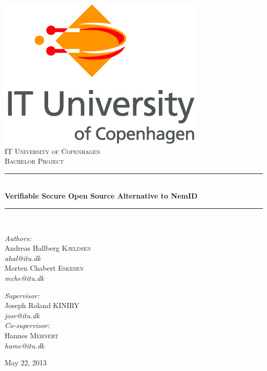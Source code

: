 \documentclass[twosided]{report}
\newcommand{\HRule}{\rule{\linewidth}{0.5mm}}
\begin{document}
\begin{titlepage}
\begin{center}

\includegraphics[scale=0.4]{images/ITULogo.jpg}\\[1cm]

\textsc{\LARGE IT University of Copenhagen}\\[1.5cm]

\textsc{\Large Bachelor Project}\\[0.5cm]


\HRule \\[0.4cm]
{\huge \bfseries Verifiable Secure Open Source Alternative to NemID}\\[0.1cm]
\HRule \\[1.5cm]

\begin{minipage}[t]{0.45\textwidth}
\begin{flushleft} \large
\emph{Authors:}
\\[10pt]
Andreas Hallberg \textsc{Kjeldsen}\\
\emph{ahal@itu.dk}
\\[10pt]
Morten Chabert \textsc{Eskesen}\\
\emph{mche@itu.dk}\\
\end{flushleft}
\end{minipage}
\begin{minipage}[t]{0.45\textwidth}
\begin{flushright} \large
\emph{Supervisor:}
\\[10pt]
Joseph Roland \textsc{KINIRY}\\
\emph{josr@itu.dk}
\\[10pt]
\emph{Co-supervisor:}
\\[10pt]
Hannes \textsc{Mehnert}\\
\emph{hame@itu.dk}
\end{flushright}
\end{minipage}

\vfill

{\large May 22, 2013}

\end{center}
\end{titlepage}
\end{document}
